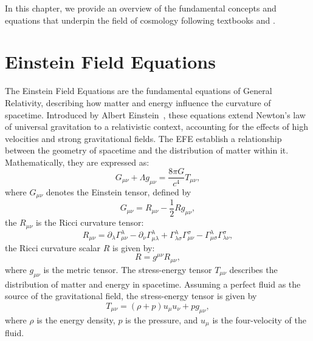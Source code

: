 In this chapter, we provide an overview of the fundamental concepts and equations that underpin the field of cosmology following textbooks \citet{2003moco.book.....D} and \citet{2008cosm.book.....W}.

\section{Einstein Field Equations}
The Einstein Field Equations are the fundamental equations of General Relativity, describing how matter and energy influence the curvature of spacetime. Introduced by Albert Einstein~\citep{1915SPAW.......844E}, these equations extend Newton's law of universal gravitation to a relativistic context, accounting for the effects of high velocities and strong gravitational fields.
The EFE establish a relationship between the geometry of spacetime and the distribution of matter within it. Mathematically, they are expressed as:
\begin{equation}
    G_{\mu\nu} + \Lambda g_{\mu\nu}= \frac{8\pi G}{c^4} T_{\mu\nu},
    \label{eq:einstein_field_equations}
\end{equation}
where \( G_{\mu\nu} \) denotes the Einstein tensor, defined by
\begin{equation}
    G_{\mu\nu} = R_{\mu\nu} - \frac{1}{2} R g_{\mu\nu},
    \label{eq:einstein_tensor}
\end{equation}
the $R_{\mu\nu}$ is the Ricci curvature tensor:
\begin{equation}
    R_{\mu\nu} = \partial_\lambda \Gamma^\lambda_{\mu\nu} - \partial_\nu \Gamma^\lambda_{\mu\lambda} + \Gamma^\lambda_{\lambda\sigma} \Gamma^\sigma_{\mu\nu} - \Gamma^\lambda_{\mu\sigma} \Gamma^\sigma_{\lambda\nu},
    \label{eq:ricci_curvature_tensor}
\end{equation}
the Ricci curvature scalar $R$ is given by:
\begin{equation}
    R = g^{\mu\nu} R_{\mu\nu},
    \label{eq:ricci_scalar}
\end{equation}
where \( g_{\mu\nu} \) is the metric tensor. The stress-energy tensor \( T_{\mu\nu} \) describes the distribution of matter and energy in spacetime.
Assuming a perfect fluid as the source of the gravitational field, the stress-energy tensor is given by
\begin{equation}
    T_{\mu\nu} = \left(\rho + p \right) u_{\mu} u_{\nu} + p g_{\mu\nu},
    \label{eq:stress_energy_tensor}
\end{equation}
where \( \rho \) is the energy density, \( p \) is the pressure, and \( u_{\mu} \) is the four-velocity of the fluid.
